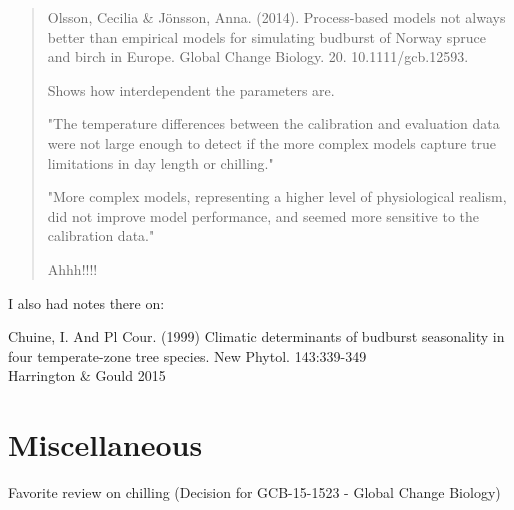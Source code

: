 \documentclass[11pt]{article}
\begin{document}
\begin{quote}
Olsson, Cecilia & Jönsson, Anna. (2014). Process-based models not always better than empirical models for simulating budburst of Norway spruce and birch in Europe. Global Change Biology. 20. 10.1111/gcb.12593.

Shows how interdependent the parameters are.

"The temperature differences between the calibration and evaluation data were not large enough to detect if the more complex models capture true limitations in day length or chilling."

"More complex models, representing a higher level of physiological realism, did not improve model performance, and seemed more sensitive to the calibration data."

Ahhh!!!!
\end{quote}

I also had notes there on:

Chuine, I. And Pl Cour. (1999) Climatic determinants of budburst seasonality in four temperate-zone tree species. New Phytol. 143:339-349\\
Harrington \& Gould 2015


\section{Miscellaneous}

Favorite review on chilling (Decision for GCB-15-1523 - Global Change Biology) 
\end{document}
